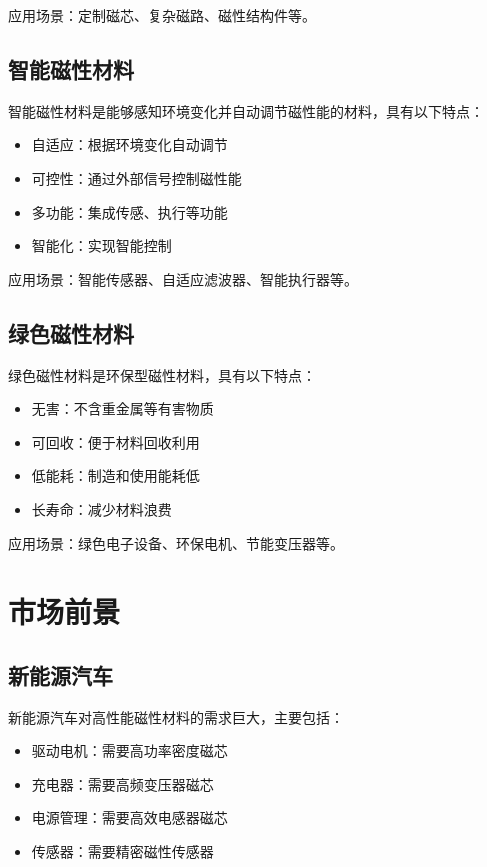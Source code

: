 \documentclass[12pt,UTF8]{ctexbook}
\begin{document}
应用场景：定制磁芯、复杂磁路、磁性结构件等。

\subsection{智能磁性材料}

智能磁性材料是能够感知环境变化并自动调节磁性能的材料，具有以下特点：

\begin{itemize}[leftmargin=2cm]
    \item 自适应：根据环境变化自动调节
    \item 可控性：通过外部信号控制磁性能
    \item 多功能：集成传感、执行等功能
    \item 智能化：实现智能控制
\end{itemize}

应用场景：智能传感器、自适应滤波器、智能执行器等。

\subsection{绿色磁性材料}

绿色磁性材料是环保型磁性材料，具有以下特点：

\begin{itemize}[leftmargin=2cm]
    \item 无害：不含重金属等有害物质
    \item 可回收：便于材料回收利用
    \item 低能耗：制造和使用能耗低
    \item 长寿命：减少材料浪费
\end{itemize}

应用场景：绿色电子设备、环保电机、节能变压器等。

\section{市场前景}

\subsection{新能源汽车}

新能源汽车对高性能磁性材料的需求巨大，主要包括：

\begin{itemize}[leftmargin=2cm]
    \item 驱动电机：需要高功率密度磁芯
    \item 充电器：需要高频变压器磁芯
    \item 电源管理：需要高效电感器磁芯
    \item 传感器：需要精密磁性传感器
\end{itemize}
\end{document}
